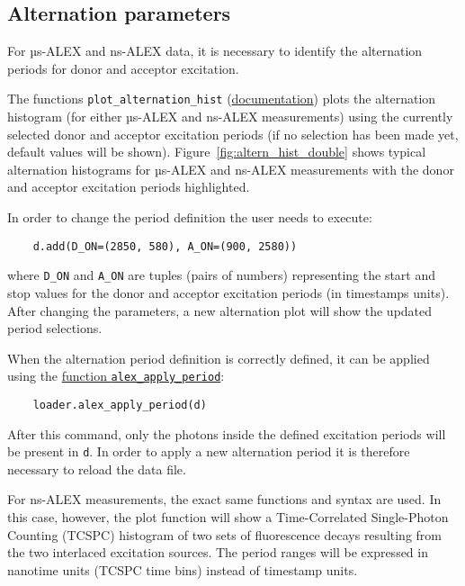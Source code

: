 \subsection{Alternation parameters}
\label{sec:alternation}

For µs-ALEX and ns-ALEX data, it is necessary to identify the
alternation periods for donor and acceptor excitation.

The functions
\verb|plot_alternation_hist| (\href{http://fretbursts.readthedocs.org/en/latest/plots.html#fretbursts.burst\_plot.plot\_alternation\_hist}{documentation})
plots the alternation histogram (for either µs-ALEX and ns-ALEX measurements)
using the currently selected donor and acceptor excitation periods
(if no selection has been made yet, default values will be shown).
Figure~\ref{fig:altern_hist_double} shows typical alternation histograms for
µs-ALEX and ns-ALEX measurements with the donor and acceptor excitation periods highlighted.

In order to change the period definition the user needs to execute:

\begin{verbatim}
    d.add(D_ON=(2850, 580), A_ON=(900, 2580))
\end{verbatim}

where \verb|D_ON| and \verb|A_ON| are tuples (pairs of numbers) representing
the start and stop values for the donor and acceptor excitation periods
(in timestamps units).
After changing the parameters, a new alternation plot will show the updated period selections.

When the alternation period definition is correctly defined, it can
be applied using the
\href{http://fretbursts.readthedocs.org/en/latest/loader.html#fretbursts.loader.alex_apply_period}{function \texttt{alex\_apply\_period}}:

\begin{verbatim}
    loader.alex_apply_period(d)
\end{verbatim}

After this command, only the photons inside the defined excitation periods
will be present in \verb|d|.  In order to apply a new alternation period
it is therefore necessary to reload the data file.

For ns-ALEX measurements, the exact same functions and syntax are used.
In this case, however, the plot function will show a Time-Correlated Single-Photon Counting
(TCSPC) histogram of two sets of fluorescence decays resulting from the two interlaced
excitation sources. The period ranges will be expressed in nanotime units (TCSPC time bins)
instead of timestamp units.
